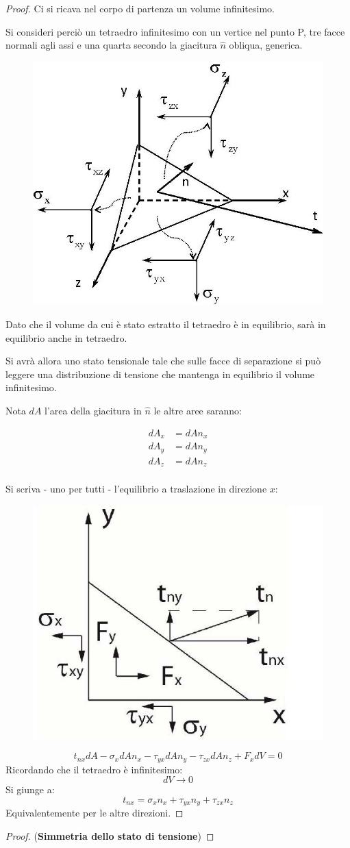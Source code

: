 \documentclass{article}
\begin{document}
\begin{adjustwidth}{2in}{}
\begin{proof}
	 Ci si ricava nel corpo di partenza un volume infinitesimo. 
	 
	 Si consideri perciò un tetraedro
	 infinitesimo con un vertice nel
	 punto P, tre facce normali agli
	 assi e una quarta secondo la
	 giacitura $\hat{n}$ obliqua, generica.
	 
\begin{figure}[H]
	\centering
	\includegraphics[width=0.4\linewidth]{immagini/1.PARTE7_Pagina_08 (2)}
\end{figure}
	Dato che il volume da cui è stato estratto il tetraedro è in equilibrio, sarà in equilibrio anche in tetraedro. 
	
	Si avrà allora uno stato tensionale tale che sulle facce di separazione si può leggere una distribuzione di tensione che mantenga in equilibrio il volume infinitesimo. \newline 
	
	 Nota $ dA $ l’area della giacitura in $\hat{n}$ le altre aree saranno: 
	 
	 \[
	 \begin{split}
		dA_x & = dA n_x \\
				dA_y & = dA n_y \\
						dA_z & = dA n_z \\
	 \end{split}
	 \]
	 
	 Si scriva - uno per tutti - l'equilibrio a traslazione in direzione $x$: 

\begin{figure}[H]
	\centering
	\includegraphics[width=0.4\linewidth]{immagini/1.PARTE7_Pagina_08}
\end{figure}	 
	 \[ 
	 t_{nx}dA - \sigma_x dA n_x - \tau_{yx} dA n_y - \tau_{zx} dA n_z + F_xdV = 0
	 \]
	 Ricordando che il tetraedro è infinitesimo: 
	 \[
	 dV \rightarrow 0
	 \]
	 Si giunge a: 
	 \[ 
	 t_{nx} = \sigma_x n_x +\tau_{yx} n_y + \tau_{zx} n_z 
	 \]
	 Equivalentemente per le altre direzioni.
\end{proof}
	 \newpage
\begin{proof} (\textbf{Simmetria dello stato di tensione}) 
	

\end{proof}
\end{adjustwidth}
\end{document}
